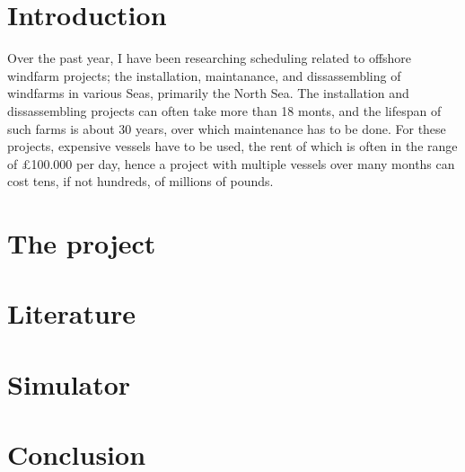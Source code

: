 \documentclass[a4paper,12pt]{article}
\begin{document}
\title{}
\author{R. Kuipers}
\date{April, 2019}

\section{Introduction}
Over the past year, I have been researching scheduling related to offshore windfarm projects; the installation, maintanance, and dissassembling of windfarms in various Seas, primarily the North Sea. The installation and dissassembling projects can often take more than 18 monts, and the lifespan of such farms is about 30 years, over which maintenance has to be done. For these projects, expensive vessels have to be used, the rent of which is often in the range of \pounds 100.000 per day, hence a project with multiple vessels over many months can cost tens, if not hundreds, of millions of pounds.  %

\section{The project}

\section{Literature}

\section{Simulator}

\section{Conclusion}
\end{document}
